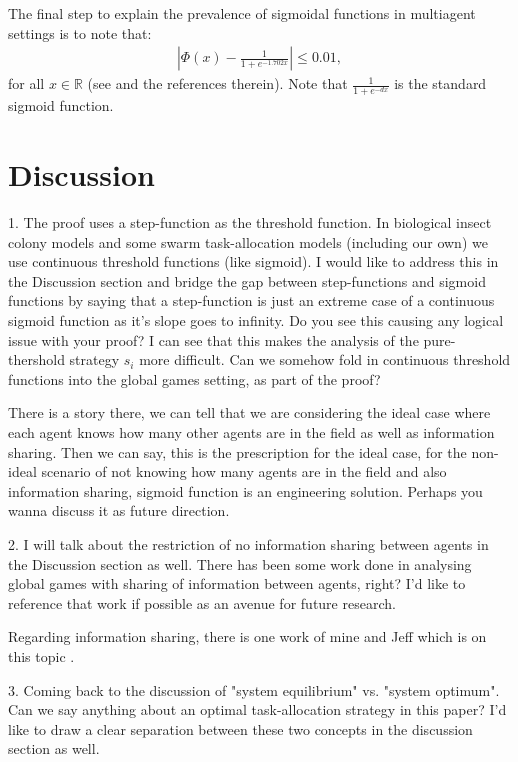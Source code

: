 \documentclass[conference]{ieeeconf}
\def\R{\mathbb{R}}
\begin{document}
The final step to explain the prevalence of sigmoidal functions in multiagent settings is to note that:
\begin{align}
|\Phi(x)-\frac{1}{1+e^{-1.702x}}|\leq 0.01,
\end{align}
for all $x\in\R$ (see \cite{camilli1994} and the references therein). Note that $\frac{1}{1+e^{-dx}}$ is the standard sigmoid function. 



\section{Discussion}\label{sec:disc}
1. The proof uses a step-function as the threshold function. In biological insect colony models and some swarm task-allocation models (including our own) we use continuous threshold functions (like sigmoid). I would like to address this in the Discussion section and bridge the gap between step-functions and sigmoid functions by saying that a step-function is just an extreme case of a continuous sigmoid function as it's slope goes to infinity. Do you see this causing any logical issue with your proof? I can see that this makes the analysis of the pure-thershold strategy $s_i$ more difficult. Can we somehow fold in continuous threshold functions into the global games setting, as part of the proof?

There is a story there, we can tell that we are considering the ideal case where each agent knows how many other agents are in the field as well as information sharing. Then we can say, this is the prescription for the ideal case, for the non-ideal scenario of not knowing how many agents are in the field and also information sharing, sigmoid function is an engineering solution. Perhaps you wanna discuss it as future direction. 

2. I will talk about the restriction of no information sharing between agents in the Discussion section as well. There has been some work done in analysing global games with sharing of information between agents, right? I'd like to reference that work if possible as an avenue for future research.

Regarding information sharing, there is one work of mine and Jeff which is on this topic \cite{Touri2014}.

3. Coming back to the discussion of "system equilibrium" vs. "system optimum". Can we say anything about an optimal task-allocation strategy in this paper? I'd like to draw a clear separation between these two concepts in the discussion section as well. 
\end{document}
